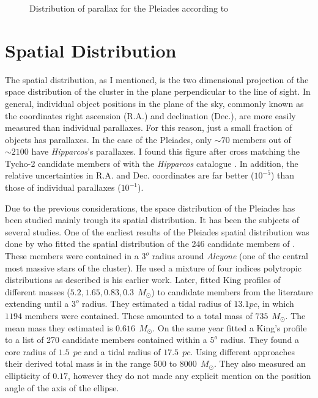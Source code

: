 \begin{figure}[htbp]
\begin{center}
\caption{Distribution of parallax for the Pleiades according to \citet{2017A&A...601A..19G}}

\label{fig:parallaxTGAS}
\end{center}
\end{figure}


\section{Spatial Distribution}
The spatial distribution, as I mentioned, is the two dimensional projection of the space distribution of the cluster in the plane perpendicular to the line of sight. In general, individual object positions in the plane of the sky, commonly known as the coordinates right ascension (R.A.) and declination (Dec.), are more easily measured than individual parallaxes. For this reason, just a small fraction of objects has parallaxes. In the case of the Pleiades, only $\sim70$ members out of $\sim2100$ have \emph{Hipparcos}'s parallaxes. I found this figure after cross matching the Tycho-2 candidate members of \citet{Bouy2015} with the \emph{Hipparcos} catalogue \citep{1997A&A...323L..49P} . In addition, the relative uncertainties in R.A. and Dec. coordinates are far better ($10^{-5}$) than those of individual parallaxes ($10^{-1}$).

Due to the previous considerations, the space distribution of the Pleiades has been studied mainly trough its spatial distribution.
It has been the subjects of several studies. One of the earliest results of the Pleiades spatial distribution was done by \citet{Limber1962} who fitted the spatial distribution of the 246 candidate members of \citet{Trumpler1921}. These members were contained in a $3^o$ radius around \emph{Alcyone} (one of the central most massive stars of the cluster). He used a mixture of four indices polytropic distributions as described is his earlier \citet{Limber1961} work. Later, \citet{Pinfield1998} fitted King profiles \citep{King1962} of different masses ($5.2,1.65,0.83,0.3 \ \ M_{\odot}$) to candidate members from the literature extending until a $3^o$ radius. They estimated a tidal radius of $13.1pc$, in which $1194$ members were contained. These amounted to a total mass of $735\ \ M_{\odot}$. The mean mass they estimated is $0.616\ \ M_{\odot}$. On the same year \citet{Raboud1998} fitted a King's profile to a list of 270 candidate members contained within a $5^o$ radius. They found a core radius of $1.5\ \ pc$ and a tidal radius of $17.5\ \ pc$. Using different approaches their derived total mass is in the range $500$ to $8000 \ \ M_{\odot}$. They also measured an ellipticity of $0.17$, however they do not made any explicit mention on the position angle of the axis of the ellipse.

